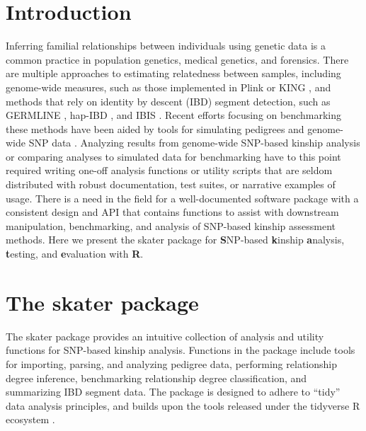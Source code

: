 \documentclass{bioinfo}
\begin{document}
\maketitle

\section{Introduction}

Inferring familial relationships between individuals using genetic data
is a common practice in population genetics, medical genetics, and
forensics. There are multiple approaches to estimating relatedness
between samples, including genome-wide measures, such as those
implemented in Plink \citep{purcell2007} or KING
\citep{manichaikul2010}, and methods that rely on identity by descent
(IBD) segment detection, such as GERMLINE \citep{gusev2009}, hap-IBD
\citep{zhou2020}, and IBIS \citep{seidman2020}. Recent efforts focusing
on benchmarking these methods \citep{ramstetter2017, vries2021} have
been aided by tools for simulating pedigrees and genome-wide SNP data
\citep{caballero2019}. Analyzing results from genome-wide SNP-based
kinship analysis or comparing analyses to simulated data for
benchmarking have to this point required writing one-off analysis
functions or utility scripts that are seldom distributed with robust
documentation, test suites, or narrative examples of usage. There is a
need in the field for a well-documented software package with a
consistent design and API that contains functions to assist with
downstream manipulation, benchmarking, and analysis of SNP-based kinship
assessment methods. Here we present the skater package for
\textbf{S}NP-based \textbf{k}inship \textbf{a}nalysis, \textbf{t}esting,
and \textbf{e}valuation with \textbf{R}.

\section{The skater package}

The skater package provides an intuitive collection of analysis and
utility functions for SNP-based kinship analysis. Functions in the
package include tools for importing, parsing, and analyzing pedigree
data, performing relationship degree inference, benchmarking
relationship degree classification, and summarizing IBD segment data.
The package is designed to adhere to ``tidy'' data analysis principles,
and builds upon the tools released under the tidyverse R ecosystem
\citep{Wickham2019}.
\end{document}
